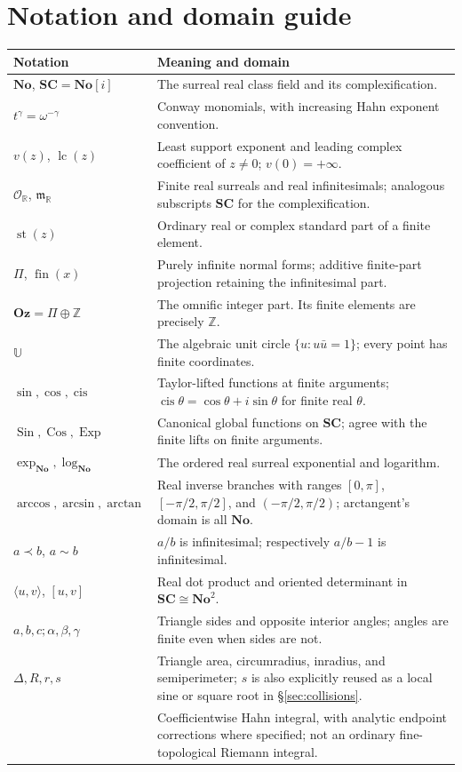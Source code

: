 \documentclass[11pt,letterpaper]{article}
\theoremstyle{definition}
\theoremstyle{remark}
\newcommand{\No}{\mathbf{No}}
\newcommand{\SC}{\mathbf{SC}}
\newcommand{\Oz}{\mathbf{Oz}}
\newcommand{\R}{\mathbb R}\newcommand{\C}{\mathbb C}
\newcommand{\Z}{\mathbb Z}\newcommand{\N}{\mathbb N}
\newcommand{\OO}{\mathcal O}\newcommand{\mm}{\mathfrak m}
\newcommand{\UU}{\mathbb U}\newcommand{\HH}{\mathcal H}
\newcommand{\st}{\operatorname{st}}
\newcommand{\fin}{\operatorname{fin}}
\newcommand{\cis}{\operatorname{cis}}
\newcommand{\Sin}{\operatorname{Sin}}
\newcommand{\Cos}{\operatorname{Cos}}
\newcommand{\Exp}{\operatorname{Exp}}
\newcommand{\lc}{\operatorname{lc}}
\newcommand{\HInt}{\mathop{\int^{\!H}}\nolimits}
\numberwithin{equation}{section}
\begin{document}
\section{Notation and domain guide}\label{app:notation}
\begin{center}\small
\begin{longtable}{@{}L{0.24\textwidth}L{0.69\textwidth}@{}}
\toprule
Notation & Meaning and domain\\
\midrule
\endhead
$\No$, $\SC=\No[i]$ & The surreal real class field and its complexification.\\[0.4em]
$t^\gamma=\omega^{-\gamma}$ & Conway monomials, with increasing Hahn exponent convention.\\[0.4em]
$v(z)$, $\lc(z)$ & Least support exponent and leading complex coefficient of $z\ne0$; $v(0)=+\infty$.\\[0.4em]
$\OO_{\R}$, $\mm_{\R}$ & Finite real surreals and real infinitesimals; analogous subscripts $\SC$ for the complexification.\\[0.4em]
$\st(z)$ & Ordinary real or complex standard part of a finite element.\\[0.4em]
$\Pi$, $\fin(x)$ & Purely infinite normal forms; additive finite-part projection retaining the infinitesimal part.\\[0.4em]
$\Oz=\Pi\oplus\Z$ & The omnific integer part. Its finite elements are precisely $\Z$.\\[0.4em]
$\UU$ & The algebraic unit circle $\{u:u\bar u=1\}$; every point has finite coordinates.\\[0.4em]
$\sin,\cos,\cis$ & Taylor-lifted functions at finite arguments; $\cis\theta=\cos\theta+i\sin\theta$ for finite real $\theta$.\\[0.4em]
$\Sin,\Cos,\Exp$ & Canonical global functions on $\SC$; agree with the finite lifts on finite arguments.\\[0.4em]
$\exp_{\No},\log_{\No}$ & The ordered real surreal exponential and logarithm.\\[0.4em]
$\arccos,\arcsin,\arctan$ & Real inverse branches with ranges $[0,\pi]$, $[-\pi/2,\pi/2]$, and $(-\pi/2,\pi/2)$; arctangent's domain is all $\No$.\\[0.4em]
$a\prec b$, $a\sim b$ & $a/b$ is infinitesimal; respectively $a/b-1$ is infinitesimal.\\[0.4em]
$\langle u,v\rangle$, $[u,v]$ & Real dot product and oriented determinant in $\SC\cong\No^2$.\\[0.4em]
$a,b,c;\alpha,\beta,\gamma$ & Triangle sides and opposite interior angles; angles are finite even when sides are not.\\[0.4em]
$\Delta,R,r,s$ & Triangle area, circumradius, inradius, and semiperimeter; $s$ is also explicitly reused as a local sine or square root in \S\ref{sec:collisions}.\\[0.4em]
$\HInt$ & Coefficientwise Hahn integral, with analytic endpoint corrections where specified; not an ordinary fine-topological Riemann integral.\\
\bottomrule
\end{longtable}
\end{center}
\end{document}
